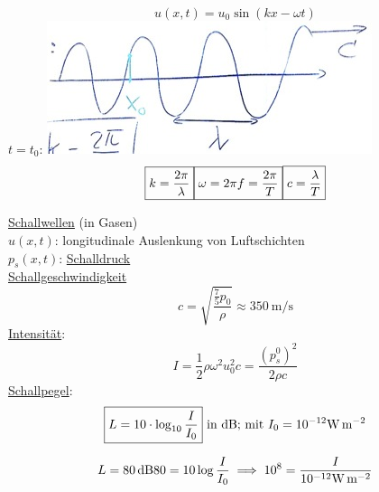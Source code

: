 \begin{rep*}[ note = Harmonische Wellen ]
	\[ u( x , t ) = u_0 \sin( kx - \omega t ) \]
	$t = t_0$: \includegraphics{Bild233} \\
	\[
		\boxed{ k = \frac{2\pi}{\lambda} } \\
		\boxed{ \omega = 2 \pi f = \frac{2\pi}{T} } \\
		\boxed{ c = \frac{\lambda}{T} }
	\]
	
	\uline{Schallwellen} (in Gasen) \\
	$u( x , t )$: longitudinale Auslenkung von Luftschichten \\
	$p_s( x , t )$: \uline{Schalldruck} \\
	\uline{Schallgeschwindigkeit}
	\[ c = \sqrt{\frac{\frac{7}{5} p_0}{\rho}} \approx \SI{350}{\metre\per\second} \]
	\uline{Intensität}:
	\[ I = \frac{1}{2} \rho \omega^2 u_0^2 c = \frac{(p_s^0)^2}{2 \rho c} \]
	\uline{Schallpegel}:
	\[ \boxed{ L = 10 \cdot \log_{10} \frac{I}{I_0} } \text{ in \si{\deci\bel};  mit } I_0 = 10^{-12} \si{\watt\per\metre\squared} \]
	\begin{bsp*}[ head = z.B. ]
		\[
			L = \SI{80}{\deci\bel} \\
			80 = 10 \log \frac{I}{I_0} \implies 10^8 = \frac{I}{ 10^{-12} \si{\watt\per\metre\squared} }
		\]
	\end{bsp*}
\end{rep*}

